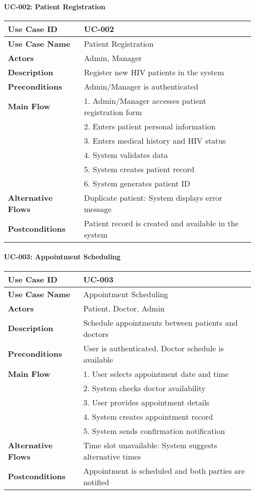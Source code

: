 \documentclass[12pt,a4paper]{article}
\begin{document}
\paragraph{UC-002: Patient Registration}
\begin{longtable}{|p{3cm}|p{11cm}|}
\hline
\textbf{Use Case ID} & UC-002 \\
\hline
\textbf{Use Case Name} & Patient Registration \\
\hline
\textbf{Actors} & Admin, Manager \\
\hline
\textbf{Description} & Register new HIV patients in the system \\
\hline
\textbf{Preconditions} & Admin/Manager is authenticated \\
\hline
\textbf{Main Flow} & 1. Admin/Manager accesses patient registration form\\
& 2. Enters patient personal information\\
& 3. Enters medical history and HIV status\\
& 4. System validates data\\
& 5. System creates patient record\\
& 6. System generates patient ID \\
\hline
\textbf{Alternative Flows} & Duplicate patient: System displays error message \\
\hline
\textbf{Postconditions} & Patient record is created and available in the system \\
\hline
\end{longtable}

\paragraph{UC-003: Appointment Scheduling}
\begin{longtable}{|p{3cm}|p{11cm}|}
\hline
\textbf{Use Case ID} & UC-003 \\
\hline
\textbf{Use Case Name} & Appointment Scheduling \\
\hline
\textbf{Actors} & Patient, Doctor, Admin \\
\hline
\textbf{Description} & Schedule appointments between patients and doctors \\
\hline
\textbf{Preconditions} & User is authenticated, Doctor schedule is available \\
\hline
\textbf{Main Flow} & 1. User selects appointment date and time\\
& 2. System checks doctor availability\\
& 3. User provides appointment details\\
& 4. System creates appointment record\\
& 5. System sends confirmation notification \\
\hline
\textbf{Alternative Flows} & Time slot unavailable: System suggests alternative times \\
\hline
\textbf{Postconditions} & Appointment is scheduled and both parties are notified \\
\hline
\end{longtable}
\end{document}
